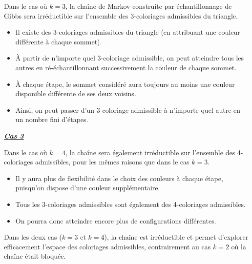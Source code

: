 \documentclass{article}
\begin{document}
\vspace{.1cm}
Dans le cas où $k=3$, la chaîne de Markov construite par échantillonnage de Gibbs 
sera irréductible sur l'ensemble des 3-coloriages admissibles du triangle. 
\begin{itemize}[left=1cm]
    \item Il existe des 3-coloriages admissibles du triangle (en attribuant une couleur 
          différente à chaque sommet).
    \item À partir de n'importe quel 3-coloriage admissible, on peut atteindre tous les 
          autres en ré-échantillonnant successivement la couleur de chaque sommet. 
    \item À chaque étape, le sommet considéré aura toujours au moins une couleur disponible 
          différente de ses deux voisins.
    \item Ainsi, on peut passer d'un 3-coloriage admissible à n'importe quel autre en 
          un nombre fini d'étapes.
\end{itemize}

\vspace{.3cm}
\underline{\textbf{\textit{Cas 3}}}

\vspace{.1cm}
Dans le cas où $k=4$, la chaîne sera également irréductible sur l'ensemble des 4-coloriages 
admissibles, pour les mêmes raisons que dans le cas $k=3$. 
\begin{itemize}[left=1cm]
    \item Il y aura plus de flexibilité dans le choix des couleurs à chaque étape, puisqu'on 
          dispose d'une couleur supplémentaire.   
    \item Tous les 3-coloriages admissibles sont également des 4-coloriages admissibles.
    \item On pourra donc atteindre encore plus de configurations différentes.
\end{itemize} 

Dans les deux cas ($k=3$ et $k=4$), la chaîne est irréductible et permet d'explorer efficacement 
l'espace des coloriages admissibles, contrairement au cas $k=2$ où la chaîne était bloquée. 
\end{document}
